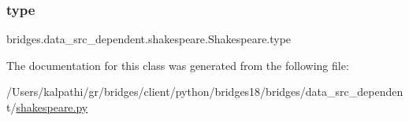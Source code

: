 \mbox{\label{classbridges_1_1data__src__dependent_1_1shakespeare_1_1_shakespeare_acb403ed7119a3b28cacd5672ebc4c6a2}} 
\subsubsection{\texorpdfstring{type}{type}}
{\footnotesize\ttfamily bridges.\+data\+\_\+src\+\_\+dependent.\+shakespeare.\+Shakespeare.\+type}



The documentation for this class was generated from the following file\+:\begin{DoxyCompactItemize}
\item 
/\+Users/kalpathi/gr/bridges/client/python/bridges18/bridges/data\+\_\+src\+\_\+dependent/\mbox{\hyperlink{shakespeare_8py}{shakespeare.\+py}}\end{DoxyCompactItemize}
